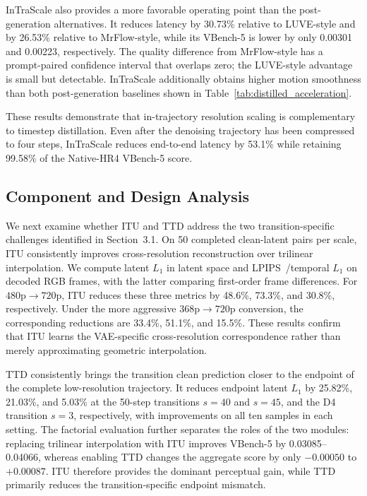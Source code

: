 \documentclass[letterpaper]{article} %
\begin{document}
InTraScale also provides a more favorable operating point than the
post-generation alternatives. It reduces latency by 30.73\% relative to
LUVE-style and by 26.53\% relative to MrFlow-style, while its VBench-5 is lower
by only 0.00301 and 0.00223, respectively. The quality difference from
MrFlow-style has a prompt-paired confidence interval that overlaps zero; the
LUVE-style advantage is small but detectable. InTraScale additionally obtains
higher motion smoothness than both post-generation baselines shown in
Table~\ref{tab:distilled_acceleration}.

These results demonstrate that in-trajectory resolution scaling is
complementary to timestep distillation. Even after the denoising trajectory
has been compressed to four steps, InTraScale reduces
end-to-end latency by 53.1\% while retaining 99.58\% of the Native-HR4
VBench-5 score.

\subsection{Component and Design Analysis}
\label{sec:component_analysis}

We next examine whether ITU and TTD address the two transition-specific
challenges identified in Section~3.1. On 50 completed clean-latent pairs per scale, ITU consistently improves
cross-resolution reconstruction over trilinear interpolation. We compute latent
\(L_1\) in latent space and LPIPS~\citep{zhang2018lpips}/temporal \(L_1\) on decoded RGB frames, with
the latter comparing first-order frame differences. For
\(480\mathrm{p}\rightarrow720\mathrm{p}\), ITU reduces these three metrics by
48.6\%, 73.3\%, and 30.8\%, respectively. Under the more aggressive
\(368\mathrm{p}\rightarrow720\mathrm{p}\) conversion, the corresponding
reductions are 33.4\%, 51.1\%, and 15.5\%. These results confirm that ITU
learns the VAE-specific cross-resolution correspondence rather than merely
approximating geometric interpolation.

TTD consistently brings the transition clean prediction closer to the endpoint of the
complete low-resolution trajectory. It reduces endpoint latent \(L_1\) by
25.82\%, 21.03\%, and 5.03\% at the 50-step transitions \(s=40\) and
\(s=45\), and the D4 transition \(s=3\), respectively, with improvements on
all ten samples in each setting. The
factorial evaluation further separates the roles of the two modules:
replacing trilinear interpolation with ITU improves VBench-5 by
0.03085--0.04066, whereas enabling TTD changes the aggregate score by only
\(-0.00050\) to \(+0.00087\). ITU therefore provides the dominant perceptual
gain, while TTD primarily reduces the transition-specific endpoint mismatch.
\end{document}
